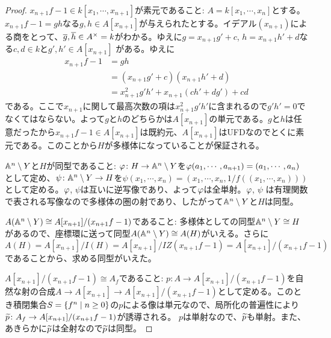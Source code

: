 \begin{proof}
  $x_{n+1}f - 1  \in k[x_1, \cdots , x_{n+1}]$が素元であること:
  $A = k[x_1, \cdots , x_n]$とする。$x_{n+1}f - 1 = gh$なる$g,h \in A[x_{n+1}]$が与えられたとする。イデアル$(x_{n+1})$による商をとって、$\overline{g},\overline{h} \in A^{\times} = k$がわかる。ゆえに$g = x_{n+1}g' + c$, $h = x_{n+1}h' + d$なる$c,d \in k$と$g' , h' \in A[x_{n+1}]$
  がある。ゆえに
  \begin{align*}
  x_{n+1}f - 1 &= gh \\
     &= (x_{n+1}g' + c)(x_{n+1}h' + d) \\
    &= x_{n+1}^2 g'h' + x_{n+1}(ch' + d g') + cd
  \end{align*}
  である。ここで$x_{n+1}$に関して最高次数の項は$x_{n+1}^2 g'h'$に含まれるので$g' h' = 0$でなくてはならない。よって$g$と$h$のどちらかは$A[x_{n+1}]$の単元である。$g$と$h$は任意だったから$x_{n+1}f - 1 \in A[x_{n+1}]$は既約元、$A[x_{n+1}]$はUFDなのでとくに素元である。このことから$H$が多様体になっていることが保証される。

  ${\mathbb A}^n \setminus Y$と$H$が同型であること:
  ${\varphi} \colon H \to {\mathbb A}^n \setminus Y$を${\varphi}(a_1, \cdots , a_{n+1}) = (a_1, \cdots , a_{n})$として定め、$\psi \colon {\mathbb A}^n \setminus Y \to H$を$\psi(x_1, \cdots , x_n) = (x_1, \cdots , x_n, 1/f((x_1, \cdots , x_n)))$として定める。${\varphi}$, $\psi$は互いに逆写像であり、よって${\varphi}$は全単射。${\varphi}$, $\psi$
  は有理関数で表される写像なので多様体の圏の射であり、したがって${\mathbb A}^n \setminus Y$と$H$は同型。

  $A({\mathbb A}^n \setminus Y) \cong A[x_{n+1}]/(x_{n+1}f - 1)$であること:
多様体としての同型${\mathbb A}^n \setminus Y \cong H$があるので、座標環に送って同型$A({\mathbb A}^n \setminus Y) \cong A(H)$がいえる。さらに$A(H) = A[x_{n+1}] / I(H) = A[x_{n+1}] / IZ(x_{n+1}f - 1) = A[x_{n+1}] / (x_{n+1}f - 1)$であることから、求める同型がいえた。

$A[x_{n+1}]/(x_{n+1}f - 1) \cong A_f$であること:
$p \colon A \to A[x_{n+1}]/(x_{n+1}f - 1)$を自然な射の合成$A \to A[x_{n+1}] \to A[x_{n+1}]/(x_{n+1}f - 1)$として定める。このとき積閉集合$S = \left\{ f^n \mathrel{} \middle| \mathrel{} n \geq 0 \right\}$の$p$による像は単元なので、局所化の普遍性により$\widetilde{p} \colon A_f \to A[x_{n+1}]/(x_{n+1}f - 1)$が誘導される。
$p$は単射なので、$\widetilde{p}$も単射。また、あきらかに$\widetilde{p}$は全射なので$\widetilde{p}$は同型。
\end{proof}


